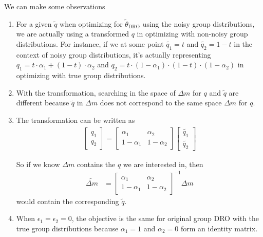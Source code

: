 \documentclass{article}
\begin{document}
    We can make some observations
    \begin{enumerate}
        \item For a given $\tilde{q}$ when optimizing for $\tilde{\theta}_{\text{DRO}}$ using the noisy group distributions, we are actually using a transformed $q$ in optimizing with non-noisy group distributions. For instance, if we at some point $\tilde{q_1} = t$ and $\tilde{q_2} = 1 - t$ in the context of noisy group distributions, it's actually representing $q_1 = t \cdot \alpha_1 + (1-t) \cdot \alpha_2$ and $q_2 = t \cdot (1 - \alpha_1) \cdot (1-t) \cdot (1 - \alpha_2)$ in optimizing with true group distributions. 
        \item With the transformation, searching in the space of $\Delta m$ for $q$ and $\tilde{q}$ are different because $\tilde{q}$ in $\Delta m$ does not correspond to the same space $\Delta m$ for $q$.
        \item The transformation can be written as
        \begin{align*}
            \begin{bmatrix}
                q_1 \\ q_2
            \end{bmatrix} = \begin{bmatrix}
                \alpha_1 & \alpha_2
                \\ 1 - \alpha_1 & 1 - \alpha_2
            \end{bmatrix} \begin{bmatrix}
                \tilde{q_1} \\ \tilde{q_2}
            \end{bmatrix}
        \end{align*}

        So if we know $\Delta m$ contains the $q$ we are interested in, then 
        \begin{align*}
            \tilde{\Delta m} &= \begin{bmatrix}
                \alpha_1 & \alpha_2
                \\ 1 - \alpha_1 & 1 - \alpha_2
            \end{bmatrix}^{-1} \Delta m
        \end{align*}
        would contain the corresponding $\tilde{q}$.
        \item When $\epsilon_1 = \epsilon_2 = 0$, the objective is the same for original group DRO with the true group distributions because $\alpha_1 = 1$ and $\alpha_2 = 0$ form an identity matrix.
    \end{enumerate}
\end{document}
